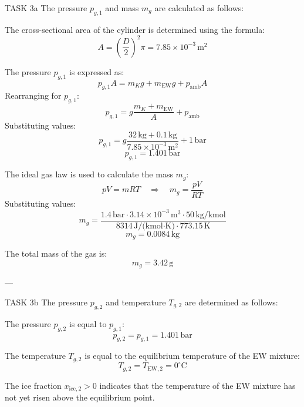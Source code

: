 TASK 3a  
The pressure \( p_{g,1} \) and mass \( m_g \) are calculated as follows:  

The cross-sectional area of the cylinder is determined using the formula:  
\[
A = \left(\frac{D}{2}\right)^2 \pi = 7.85 \times 10^{-3} \, \text{m}^2
\]  

The pressure \( p_{g,1} \) is expressed as:  
\[
p_{g,1} A = m_K g + m_{\text{EW}} g + p_{\text{amb}} A
\]  
Rearranging for \( p_{g,1} \):  
\[
p_{g,1} = g \frac{m_K + m_{\text{EW}}}{A} + p_{\text{amb}}
\]  
Substituting values:  
\[
p_{g,1} = g \frac{32 \, \text{kg} + 0.1 \, \text{kg}}{7.85 \times 10^{-3} \, \text{m}^2} + 1 \, \text{bar}
\]  
\[
p_{g,1} = 1.401 \, \text{bar}
\]  

The ideal gas law is used to calculate the mass \( m_g \):  
\[
p V = m R T \quad \Rightarrow \quad m_g = \frac{p V}{R T}
\]  
Substituting values:  
\[
m_g = \frac{1.4 \, \text{bar} \cdot 3.14 \times 10^{-3} \, \text{m}^3 \cdot 50 \, \text{kg/kmol}}{8314 \, \text{J/(kmol·K)} \cdot 773.15 \, \text{K}}
\]  
\[
m_g = 0.0084 \, \text{kg}
\]  

The total mass of the gas is:  
\[
m_g = 3.42 \, \text{g}
\]  

---

TASK 3b  
The pressure \( p_{g,2} \) and temperature \( T_{g,2} \) are determined as follows:  

The pressure \( p_{g,2} \) is equal to \( p_{g,1} \):  
\[
p_{g,2} = p_{g,1} = 1.401 \, \text{bar}
\]  

The temperature \( T_{g,2} \) is equal to the equilibrium temperature of the EW mixture:  
\[
T_{g,2} = T_{\text{EW},2} = 0^\circ\text{C}
\]  

The ice fraction \( x_{\text{ice},2} > 0 \) indicates that the temperature of the EW mixture has not yet risen above the equilibrium point.